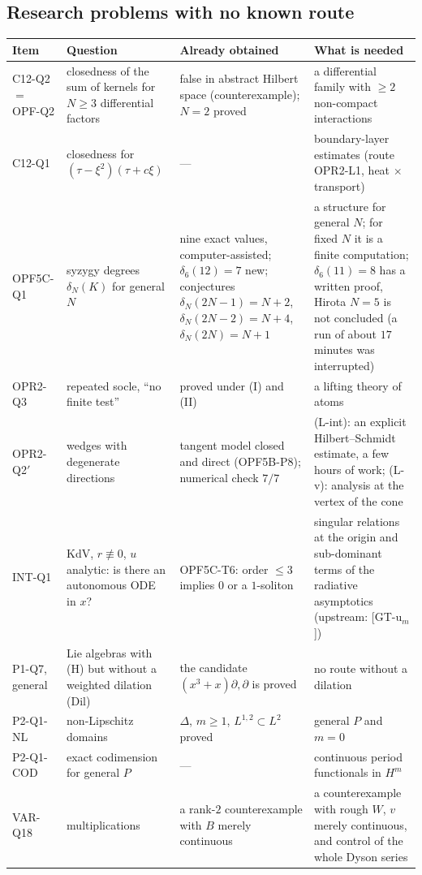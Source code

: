\subsection{Research problems with no known route}

\begin{center}\small
\begin{longtable}{@{}L{2.5cm}L{4.0cm}L{4.2cm}L{4.0cm}@{}}
\toprule
Item & Question & Already obtained & What is needed\\\midrule\endhead
C12-Q2 $=$ OPF-Q2 & closedness of the sum of kernels for $N\ge3$ differential factors & false in abstract Hilbert space (counterexample); $N=2$ proved & a differential family with $\ge2$ non-compact interactions\\
C12-Q1 & closedness for $(\tau-\xi^2)(\tau+c\xi)$ & --- & boundary-layer estimates (route OPR2-L1, heat $\times$ transport)\\
OPF5C-Q1 & syzygy degrees $\delta_N(K)$ for general $N$ & nine exact values, computer-assisted; $\delta_6(12)=7$ new; conjectures $\delta_N(2N-1)=N+2$, $\delta_N(2N-2)=N+4$, $\delta_N(2N)=N+1$ & a structure for general $N$; for fixed $N$ it is a finite computation; $\delta_6(11)=8$ has a written proof, Hirota $N=5$ is not concluded (a run of about $17$ minutes was interrupted)\\
OPR2-Q3 & repeated socle, ``no finite test'' & proved under (I) and (II) & a lifting theory of atoms\\
OPR2-Q2$'$ & wedges with degenerate directions & tangent model closed and direct (OPF5B-P8); numerical check $7/7$ & (L-int): an explicit Hilbert--Schmidt estimate, a few hours of work; (L-v): analysis at the vertex of the cone\\
INT-Q1 & KdV, $r\not\equiv0$, $u$ analytic: is there an autonomous ODE in $x$? & OPF5C-T6: order $\le3$ implies $0$ or a $1$-soliton & singular relations at the origin and sub-dominant terms of the radiative asymptotics (upstream: [GT-u$_m$])\\
P1-Q7, general & Lie algebras with (H) but without a weighted dilation (Dil) & the candidate $(x^3+x)\partial,\partial$ is proved & no route without a dilation\\
P2-Q1-NL & non-Lipschitz domains & $\Delta$, $m\ge1$, $L^{1,2}\subset L^2$ proved & general $P$ and $m=0$\\
P2-Q1-COD & exact codimension for general $P$ & --- & continuous period functionals in $H^m$\\
VAR-Q18 & multiplications & a rank-$2$ counterexample with $B$ merely continuous & a counterexample with rough $W$, $v$ merely continuous, and control of the whole Dyson series\\

\end{longtable}
\end{center}
